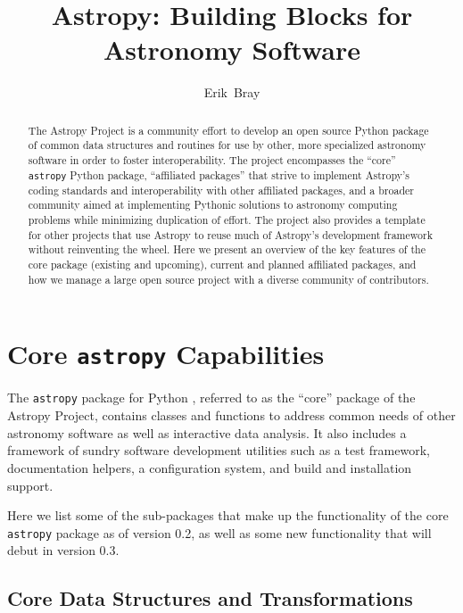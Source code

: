 \documentclass[11pt,twoside]{article}
\begin{document}
\title{Astropy: Building Blocks for Astronomy Software}

\author{Erik~Bray
}

\begin{abstract}
The Astropy Project is a community effort to develop an open source Python
package of common data structures and routines for use by other, more
specialized astronomy software in order to foster interoperability.
The project encompasses the ``core'' \texttt{astropy} Python package,
``affiliated packages'' that strive to implement Astropy's coding standards and
interoperability with other affiliated packages, and a broader community aimed
at implementing Pythonic solutions to astronomy computing problems while
minimizing duplication of effort.  The project also provides a template for
other projects that use Astropy to reuse much of Astropy's development
framework without reinventing the wheel.
Here we present an overview of the key features of the core package (existing
and upcoming), current and planned affiliated packages, and how we manage a
large open source project with a diverse community of contributors.
\end{abstract}

\section{Core \texttt{astropy} Capabilities}

The \texttt{astropy} package for Python \citep{2013arXiv1307.6212T}, referred
to as the ``core'' package of the Astropy Project, contains classes and functions
to address common needs of other astronomy software as well as interactive data
analysis.  It also includes a framework of sundry software development
utilities such as a test framework, documentation helpers, a configuration
system, and build and installation support.

Here we list some of the sub-packages that make up the functionality of the
core \texttt{astropy} package as of version 0.2, as well as some new
functionality that will debut in version 0.3.

\subsection{Core Data Structures and Transformations}

\end{document}
